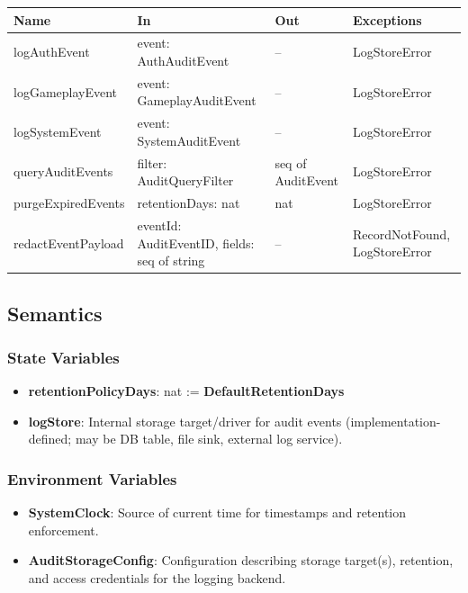 \documentclass[12pt, titlepage]{article}
\begin{document}
\begin{center}
\begin{tabular}{p{4.5cm} p{4.5cm} p{3.5cm} p{3.5cm}}
\toprule
\textbf{Name} & \textbf{In} & \textbf{Out} & \textbf{Exceptions} \\
\midrule
logAuthEvent & event: AuthAuditEvent & -- & LogStoreError \\
logGameplayEvent & event: GameplayAuditEvent & -- & LogStoreError \\
logSystemEvent & event: SystemAuditEvent & -- & LogStoreError \\
queryAuditEvents & filter: AuditQueryFilter & seq of AuditEvent & LogStoreError \\
purgeExpiredEvents & retentionDays: nat & nat & LogStoreError \\
redactEventPayload & eventId: AuditEventID, fields: seq of string & -- & RecordNotFound, LogStoreError \\
\bottomrule
\end{tabular}
\end{center}

\subsection{Semantics}

\subsubsection{State Variables}
\begin{itemize}
    \item \textbf{retentionPolicyDays}: nat := \textbf{DefaultRetentionDays}
    \item \textbf{logStore}: Internal storage target/driver for audit events (implementation-defined; may be DB table, file sink, external log service).
\end{itemize}

\subsubsection{Environment Variables}
\begin{itemize}
    \item \textbf{SystemClock}: Source of current time for timestamps and retention enforcement.
    \item \textbf{AuditStorageConfig}: Configuration describing storage target(s), retention, and access credentials for the logging backend.
\end{itemize}
\end{document}

